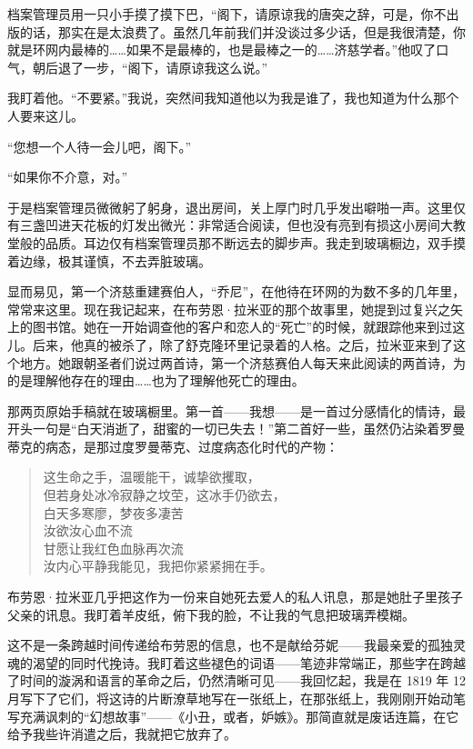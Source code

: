 \documentclass[AutoFakeBold=true]{book}
\begin{document}
档案管理员用一只小手摸了摸下巴，``阁下，请原谅我的唐突之辞，可是，你不出版的话，那实在是太浪费了。虽然几年前我们并没谈过多少话，但是我很清楚，你就是环网内最棒的……如果不是最棒的，也是最棒之一的……济慈学者。''他叹了口气，朝后退了一步，``阁下，请原谅我这么说。''

我盯着他。``不要紧。''我说，突然间我知道他以为我是谁了，我也知道为什么那个人要来这儿。

``您想一个人待一会儿吧，阁下。''

``如果你不介意，对。''

于是档案管理员微微躬了躬身，退出房间，关上厚门时几乎发出噼啪一声。这里仅有三盏凹进天花板的灯发出微光：非常适合阅读，但也没有亮到有损这小房间大教堂般的品质。耳边仅有档案管理员那不断远去的脚步声。我走到玻璃橱边，双手摸着边缘，极其谨慎，不去弄脏玻璃。

显而易见，第一个济慈重建赛伯人，``乔尼''，在他待在环网的为数不多的几年里，常常来这里。现在我记起来，在布劳恩·拉米亚的那个故事里，她提到过复兴之矢上的图书馆。她在一开始调查他的客户和恋人的``死亡''的时候，就跟踪他来到过这儿。后来，他真的被杀了，除了舒克隆环里记录着的人格。之后，拉米亚来到了这个地方。她跟朝圣者们说过两首诗，第一个济慈赛伯人每天来此阅读的两首诗，为的是理解他存在的理由……也为了理解他死亡的理由。

那两页原始手稿就在玻璃橱里。第一首——我想——是一首过分感情化的情诗，最开头一句是``白天消逝了，甜蜜的一切已失去！''第二首好一些，虽然仍沾染着罗曼蒂克的病态，是那过度罗曼蒂克、过度病态化时代的产物：

\begin{quote}
	{\kaishu 这生命之手，温暖能干，诚挚欲攫取，\\
	但若身处冰冷寂静之坟茔，这冰手仍欲去，\\
	白天多寒廖，梦夜多凄苦\\
	汝欲汝心血不流\\
	甘愿让我红色血脉再次流\\
	汝内心平静我能见，我把你紧紧拥在手。}
\end{quote}

布劳恩·拉米亚几乎把这作为一份来自她死去爱人的私人讯息，那是她肚子里孩子父亲的讯息。我盯着羊皮纸，俯下我的脸，不让我的气息把玻璃弄模糊。

这不是一条跨越时间传递给布劳恩的信息，也不是献给芬妮——我最亲爱的孤独灵魂的渴望的同时代挽诗。我盯着这些褪色的词语——笔迹非常端正，那些字在跨越了时间的漩涡和语言的革命之后，仍然清晰可见——我回忆起，我是在 1819 年 12 月写下了它们，将这诗的片断潦草地写在一张纸上，在那张纸上，我刚刚开始动笔写充满讽刺的``幻想故事''——《小丑，或者，妒嫉》。那简直就是废话连篇，在它给予我些许消遣之后，我就把它放弃了。
\end{document}
